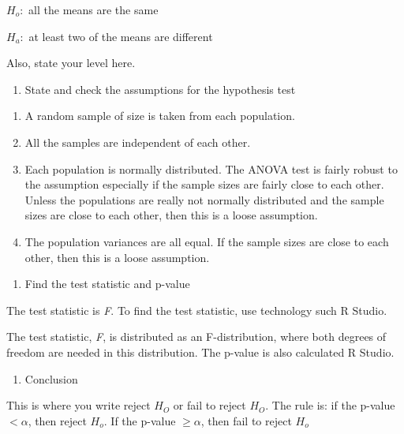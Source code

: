 \documentclass[
]{book}
\providecommand{\tightlist}{%
  \setlength{\itemsep}{0pt}\setlength{\parskip}{0pt}}
\begin{document}
\(H_o:\) all the means are the same

\(H_a:\) at least two of the means are different

Also, state your level here.

\begin{enumerate}
\def\labelenumi{\arabic{enumi}.}
\setcounter{enumi}{2}
\tightlist
\item
  State and check the assumptions for the hypothesis test
\end{enumerate}

\begin{enumerate}
\def\labelenumi{\alph{enumi}.}
\item
  A random sample of size is taken from each population.
\item
  All the samples are independent of each other.
\item
  Each population is normally distributed. The ANOVA test is fairly robust to the assumption especially if the sample sizes are fairly close to each other. Unless the populations are really not normally distributed and the sample sizes are close to each other, then this is a loose assumption.
\item
  The population variances are all equal. If the sample sizes are close to each other, then this is a loose assumption.
\end{enumerate}

\begin{enumerate}
\def\labelenumi{\arabic{enumi}.}
\setcounter{enumi}{3}
\tightlist
\item
  Find the test statistic and p-value
\end{enumerate}

The test statistic is \emph{F}. To find the test statistic, use technology such R Studio.

The test statistic, \emph{F}, is distributed as an F-distribution, where both degrees of freedom are needed in this distribution. The p-value is also calculated R Studio.

\begin{enumerate}
\def\labelenumi{\arabic{enumi}.}
\setcounter{enumi}{4}
\tightlist
\item
  Conclusion
\end{enumerate}

This is where you write reject \(H_O\) or fail to reject \(H_O\). The rule is: if the p-value \(<\alpha\), then reject \(H_o\). If the p-value \(\ge \alpha\), then fail to reject \(H_o\)
\end{document}
